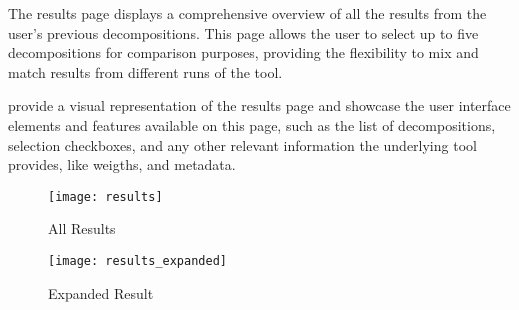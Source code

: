 The results page displays a comprehensive overview of all the results from the
user's previous decompositions. This page allows the user to select up to five
decompositions for comparison purposes, providing the flexibility to mix and
match results from different runs of the tool.

 provide a visual representation of the
results page and showcase the user interface elements and features available on
this page, such as the list of decompositions, selection checkboxes, and any
other relevant information the underlying tool provides, like weigths, and
metadata.

\begin{figure*}[!htb]
  \caption{All Results}
  \label{fig:results}
  \centering
  \texttt{[image: results]}
\end{figure*}
\begin{figure*}[!htb]
  \caption{Expanded Result}
  \label{fig:expanded_result}
  \centering
  \texttt{[image: results\_expanded]}
\end{figure*}
